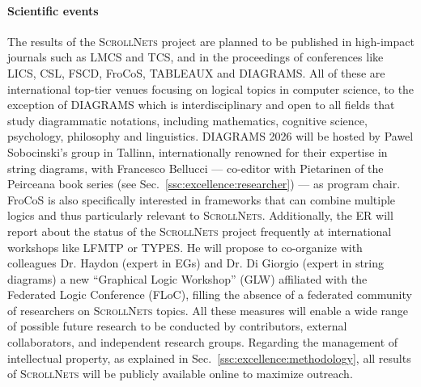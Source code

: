\documentclass[11pt]{msca-pf}
\newcommand{\proj}{\small\textsc{ScrollNets}}
\begin{document}
\paragraph{Scientific events}
The results of the {\proj} project are planned to be published in high-impact journals such as LMCS
and TCS, and in the proceedings of conferences like LICS, CSL, FSCD, FroCoS, TABLEAUX and DIAGRAMS.
All of these are international top-tier venues focusing on logical topics in computer science, to
the exception of DIAGRAMS which is interdisciplinary and open to all fields that study diagrammatic
notations, including mathematics, cognitive science, psychology, philosophy and linguistics.
DIAGRAMS 2026 will be hosted by Pawel Sobocinski's group in Tallinn, internationally renowned for
their expertise in string diagrams, with Francesco Bellucci --- co-editor with Pietarinen of the
Peirceana book series (see Sec.~\ref{ssc:excellence:researcher}) --- as program chair. FroCoS is
also specifically interested in frameworks that can combine multiple logics and thus particularly
relevant to {\proj}. Additionally, the ER will report about the status of the {\proj} project
frequently at international workshops like LFMTP or TYPES. He will propose to co-organize with
colleagues Dr. Haydon (expert in EGs) and Dr. Di Giorgio (expert in string diagrams) a new
``Graphical Logic Workshop'' (GLW) affiliated with the Federated Logic Conference (FLoC), filling
the absence of a federated community of researchers on {\proj} topics. All these measures will
enable a wide range of possible future research to be conducted by contributors, external
collaborators, and independent research groups. Regarding the management of intellectual property,
as explained in Sec.~\ref{ssc:excellence:methodology}, all results of {\proj} will be publicly
available online to maximize outreach.
\end{document}
